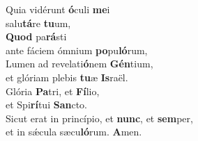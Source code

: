 \evenverse Quia vidérunt \textbf{ó}culi \textbf{me}i~\*\\
\evenverse salu\textbf{tá}re \textbf{tu}um,\\
\oddverse \textbf{Quod} pa\textbf{rá}sti~\*\\
\oddverse ante fáciem ómnium \textbf{po}pu\textbf{ló}rum,\\
\evenverse Lumen ad revelati\textbf{ó}nem \textbf{Gén}tium,~\*\\
\evenverse et glóriam plebis \textbf{tu}æ \textbf{Is}raël.\\
\oddverse Glória \textbf{Pa}tri, et \textbf{Fí}lio,~\*\\
\oddverse et Spi\textbf{rí}tui \textbf{San}cto.\\
\evenverse Sicut erat in princípio, et \textbf{nunc}, et \textbf{sem}per,~\*\\
\evenverse et in sǽcula sæcu\textbf{ló}rum. \textbf{A}men.\\
